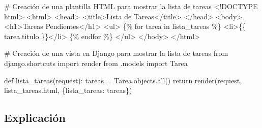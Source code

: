 \documentclass[
  a4paper,
  DIV=11,
  numbers=noendperiod,
  onepage,
  openany]{scrreprt}
\newenvironment{Shaded}{\begin{snugshade}}{\end{snugshade}}
\newcommand{\BuiltInTok}[1]{\textcolor[rgb]{0.00,0.23,0.31}{#1}}
\newcommand{\CommentTok}[1]{\textcolor[rgb]{0.37,0.37,0.37}{#1}}
\newcommand{\ControlFlowTok}[1]{\textcolor[rgb]{0.00,0.23,0.31}{#1}}
\newcommand{\DataTypeTok}[1]{\textcolor[rgb]{0.68,0.00,0.00}{#1}}
\newcommand{\ImportTok}[1]{\textcolor[rgb]{0.00,0.46,0.62}{#1}}
\newcommand{\KeywordTok}[1]{\textcolor[rgb]{0.00,0.23,0.31}{#1}}
\newcommand{\NormalTok}[1]{\textcolor[rgb]{0.00,0.23,0.31}{#1}}
\newcommand{\OperatorTok}[1]{\textcolor[rgb]{0.37,0.37,0.37}{#1}}
\newcommand{\StringTok}[1]{\textcolor[rgb]{0.13,0.47,0.30}{#1}}
\begin{document}
\begin{Shaded}
\begin{Highlighting}[]
\NormalTok{\# Creación de una plantilla HTML para mostrar la lista de tareas}
\DataTypeTok{\textless{}!DOCTYPE }\NormalTok{html}\DataTypeTok{\textgreater{}}
\DataTypeTok{\textless{}}\KeywordTok{html}\DataTypeTok{\textgreater{}}
\DataTypeTok{\textless{}}\KeywordTok{head}\DataTypeTok{\textgreater{}}
    \DataTypeTok{\textless{}}\KeywordTok{title}\DataTypeTok{\textgreater{}}\NormalTok{Lista de Tareas}\DataTypeTok{\textless{}/}\KeywordTok{title}\DataTypeTok{\textgreater{}}
\DataTypeTok{\textless{}/}\KeywordTok{head}\DataTypeTok{\textgreater{}}
\DataTypeTok{\textless{}}\KeywordTok{body}\DataTypeTok{\textgreater{}}
    \DataTypeTok{\textless{}}\KeywordTok{h1}\DataTypeTok{\textgreater{}}\NormalTok{Tareas Pendientes}\DataTypeTok{\textless{}/}\KeywordTok{h1}\DataTypeTok{\textgreater{}}
    \DataTypeTok{\textless{}}\KeywordTok{ul}\DataTypeTok{\textgreater{}}
\NormalTok{        \{\% for tarea in lista\_tareas \%\}}
            \DataTypeTok{\textless{}}\KeywordTok{li}\DataTypeTok{\textgreater{}}\NormalTok{\{\{ tarea.titulo \}\}}\DataTypeTok{\textless{}/}\KeywordTok{li}\DataTypeTok{\textgreater{}}
\NormalTok{        \{\% endfor \%\}}
    \DataTypeTok{\textless{}/}\KeywordTok{ul}\DataTypeTok{\textgreater{}}
\DataTypeTok{\textless{}/}\KeywordTok{body}\DataTypeTok{\textgreater{}}
\DataTypeTok{\textless{}/}\KeywordTok{html}\DataTypeTok{\textgreater{}}
\end{Highlighting}
\end{Shaded}

\begin{Shaded}
\begin{Highlighting}[]

\CommentTok{\# Creación de una vista en Django para mostrar la lista de tareas}
\ImportTok{from}\NormalTok{ django.shortcuts }\ImportTok{import}\NormalTok{ render}
\ImportTok{from}\NormalTok{ .models }\ImportTok{import}\NormalTok{ Tarea}

\KeywordTok{def}\NormalTok{ lista\_tareas(request):}
\NormalTok{    tareas }\OperatorTok{=}\NormalTok{ Tarea.objects.}\BuiltInTok{all}\NormalTok{()}
    \ControlFlowTok{return}\NormalTok{ render(request, }\StringTok{\textquotesingle{}lista\_tareas.html\textquotesingle{}}\NormalTok{, \{}\StringTok{\textquotesingle{}lista\_tareas\textquotesingle{}}\NormalTok{: tareas\})}
\end{Highlighting}
\end{Shaded}

\subsection{Explicación}\label{explicaciuxf3n-48}
\end{document}
